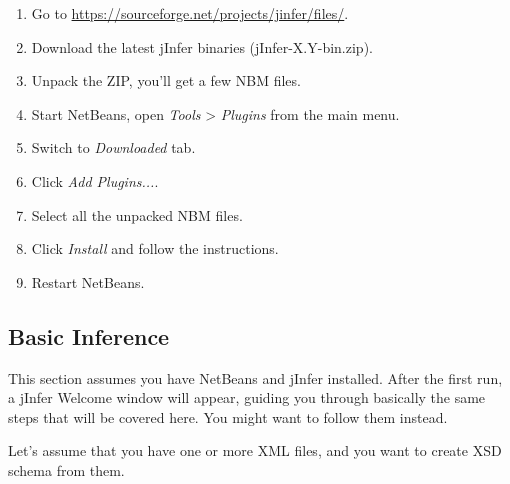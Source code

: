 \documentclass[a4paper,10pt,oneside]{article}
\begin{document}
\begin{enumerate}
  \item Go to \url{https://sourceforge.net/projects/jinfer/files/}.
  \item Download the latest jInfer binaries (jInfer-X.Y-bin.zip).
  \item Unpack the ZIP, you'll get a few NBM files.
  \item Start NetBeans, open \textit{Tools} > \textit{Plugins} from the main menu.
  \item Switch to \textit{Downloaded} tab.
  \item Click \textit{Add Plugins...}.
  \item Select all the unpacked NBM files.
  \item Click \textit{Install} and follow the instructions.
  \item Restart NetBeans.
  \end{enumerate}
\subsection*{Basic Inference}
\par 
  This section assumes you have NetBeans and jInfer installed. After the first run, a jInfer Welcome window will appear, guiding you through basically the same steps that will be covered here. You might want to follow them instead.

\par 
  Let's assume that you have one or more XML files, and you want to create XSD schema from them.
\end{document}
